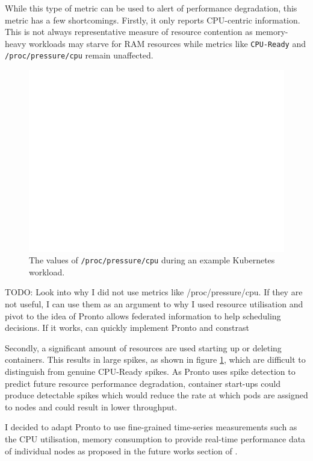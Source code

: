 While this type of metric can be used to alert of performance degradation,
this metric has a few shortcomings. Firstly, it only reports CPU-centric
information. This is not always representative measure of resource
contention as memory-heavy workloads may starve for RAM resources while
metrics like \verb|CPU-Ready| and \verb|/proc/pressure/cpu| remain
unaffected.
\begin{figure}[h]
    \centering
    \includegraphics[width=\textwidth]{images/blank.pdf}
    \caption{The values of \texttt{/proc/pressure/cpu} during an example Kubernetes workload.}
    \label{pressure-eval}
\end{figure}
TODO: Look into why I did not use metrics like /proc/pressure/cpu. If they
are not useful, I can use them as an argument to why I used resource
utilisation and pivot to the idea of Pronto allows federated information to
help scheduling decisions. If it works, can quickly implement Pronto and
constrast

Secondly, a significant amount of resources are used starting up or deleting
containers. This results in large spikes, as shown in figure
\ref{pressure-eval}, which are difficult to distinguish from genuine CPU-Ready
spikes. As Pronto uses spike detection to predict future resource performance
degradation, container start-ups could produce detectable spikes which would
reduce the rate at which pods are assigned to nodes and could result in lower
throughput.

I decided to adapt Pronto to use fine-grained time-series measurements such as
the CPU utilisation, memory consumption to provide real-time performance data of
individual nodes as proposed in the future works section of
\cite{grammenos_pronto_2021}.

